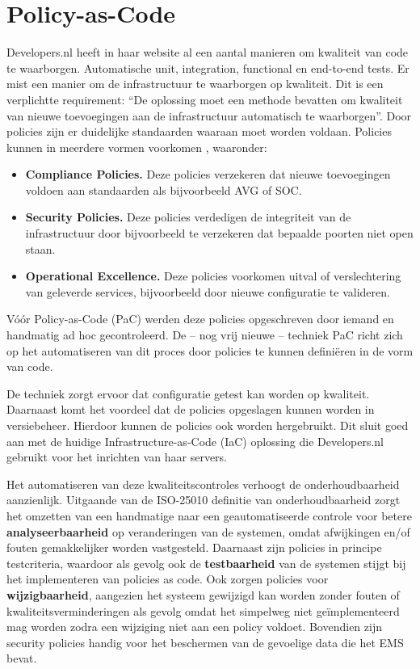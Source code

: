 \section{Policy-as-Code} %
Developers.nl heeft in haar website al een aantal manieren om kwaliteit van code te waarborgen. Automatische unit, integration, functional en end-to-end tests. Er mist een manier om de infrastructuur te waarborgen op kwaliteit. Dit is een verplichtte requirement: \enquote{De oplossing moet een methode bevatten om kwaliteit van nieuwe toevoegingen aan de infrastructuur automatisch te waarborgen}. Door policies zijn er duidelijke standaarden waaraan moet worden voldaan. Policies kunnen in meerdere vormen voorkomen \parencite{WhyPaC}, waaronder:
\begin{itemize}
	\item \textbf{Compliance Policies.} Deze policies verzekeren dat nieuwe toevoegingen voldoen aan standaarden als bijvoorbeeld AVG of SOC.
	\item \textbf{Security Policies.} Deze policies verdedigen de integriteit van de infrastructuur door bijvoorbeeld te verzekeren dat bepaalde poorten niet open staan.
	\item \textbf{Operational Excellence.} Deze policies voorkomen uitval of verslechtering van geleverde services, bijvoorbeeld door nieuwe configuratie te valideren.
\end{itemize}

Vóór Policy-as-Code (PaC) werden deze policies opgeschreven door iemand en handmatig ad hoc gecontroleerd. De -- nog vrij nieuwe -- techniek PaC richt zich op het automatiseren van dit proces door policies te kunnen definiëren in de vorm van code. 

De techniek zorgt ervoor dat configuratie getest kan worden op kwaliteit. Daarnaast komt het voordeel dat de policies opgeslagen kunnen worden in versiebeheer. Hierdoor kunnen de policies ook worden hergebruikt. Dit sluit goed aan met de huidige Infrastructure-as-Code (IaC) oplossing die Developers.nl gebruikt voor het inrichten van haar servers.

Het automatiseren van deze kwaliteitscontroles verhoogt de onderhoudbaarheid aanzienlijk. Uitgaande van de ISO-25010 definitie van onderhoudbaarheid \parencite{ISO25010} zorgt het omzetten van een handmatige naar een geautomatiseerde controle voor betere \textbf{analyseerbaarheid} op veranderingen van de systemen, omdat afwijkingen en/of fouten gemakkelijker worden vastgesteld. Daarnaast zijn policies in principe testcriteria, waardoor als gevolg ook de \textbf{testbaarheid} van de systemen stijgt bij het implementeren van policies as code. Ook zorgen policies voor \textbf{wijzigbaarheid}, aangezien het systeem gewijzigd kan worden zonder fouten of kwaliteitsverminderingen als gevolg omdat het simpelweg niet geïmplementeerd mag worden zodra een wijziging niet aan een policy voldoet. Bovendien zijn security policies handig voor het beschermen van de gevoelige data die het EMS bevat.

